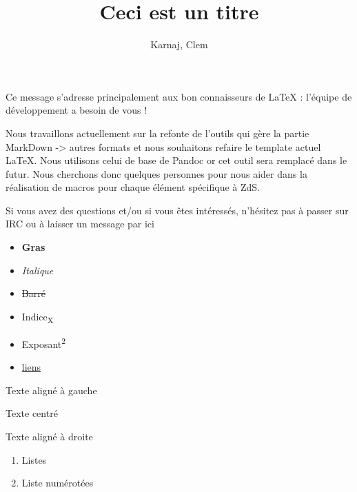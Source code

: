 \documentclass[small]{zmdocument}
\title{Ceci est un titre}
\author{Karnaj, Clem}
\begin{document}
\maketitle
\tableofcontents


Ce message s’adresse principalement aux bon connaisseurs de LaTeX : l’équipe de développement a besoin de vous !

Nous travaillons actuellement sur la refonte de l’outils qui gère la partie MarkDown -> autres formats et nous souhaitons refaire le template actuel LaTeX. Nous utilisons celui de base de Pandoc or cet outil sera remplacé dans le futur. Nous cherchons donc quelques personnes pour nous aider dans la réalisation de macros pour chaque élément spécifique à ZdS.

Si vous avez des questions et/ou si vous êtes intéressés, n’hésitez pas à passer sur IRC ou à laisser un message par ici


\begin{itemize}
\item \textbf{Gras}
\item \textit{Italique}
\item \sout{Barré}
\item Indice\textsubscript{X}
\item Exposant\textsuperscript{2}
\item \href{zestedesavoir.com}{liens}
\end{itemize}

\begin{flushleft}
Texte aligné à gauche
\end{flushleft}

\begin{center}
Texte centré
\end{center}

\begin{flushright}
Texte aligné à droite
\end{flushright}

\begin{enumerate}
\item Listes
\item Liste numérotées
\end{enumerate}

\end{document}

